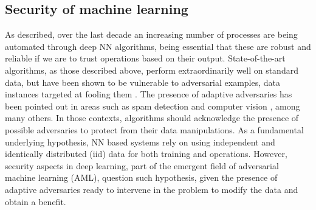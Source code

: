 


\subsection{Security of machine learning}


As described, over the last decade
an increasing number of processes are being automated through 
deep NN algorithms, being 
essential that these are robust and reliable
if we are to
trust operations based on their output. State-of-the-art
algorithms, as those described above, perform extraordinarily well on standard data,  but have been
shown to be vulnerable to adversarial examples, data instances targeted at
fooling them \parencite{goodfellow2014explaining}.
The presence of adaptive adversaries has
been pointed out in areas such as spam detection \parencite{zeager2017adversarial}
and computer vision \parencite{goodfellow2014explaining}, among many others. 
In those contexts, algorithms should acknowledge the presence of possible adversaries
to protect from their data manipulations.
As a fundamental underlying hypothesis, NN
based systems rely on using 
independent and identically distributed (iid) data for both training and operations. However, security aspects in deep
learning, part of the emergent field of
adversarial machine learning (AML),
question such hypothesis, given the
presence of adaptive adversaries ready to  intervene in the problem 
to modify the data and obtain a benefit. 

